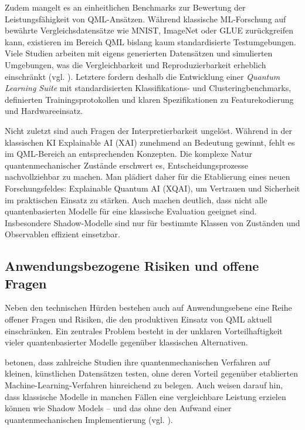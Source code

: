 Zudem mangelt es an einheitlichen Benchmarks zur Bewertung der Leistungsfähigkeit von QML-Ansätzen. Während klassische ML-Forschung auf bewährte Vergleichsdatensätze wie MNIST, ImageNet oder GLUE zurückgreifen kann, existieren im Bereich QML bislang kaum standardisierte Testumgebungen. Viele Studien arbeiten mit eigens generierten Datensätzen und simulierten Umgebungen, was die Vergleichbarkeit und Reproduzierbarkeit erheblich einschränkt (vgl. \cite{gujjuQuantumMachineLearning2024}).
Letztere fordern deshalb die Entwicklung einer \textit{Quantum Learning Suite} mit standardisierten Klassifikations- und Clusteringbenchmarks, definierten Trainingsprotokollen und klaren Spezifikationen zu Featurekodierung und Hardwareeinsatz.

Nicht zuletzt sind auch Fragen der Interpretierbarkeit ungelöst. Während in der klassischen KI Explainable AI (XAI) zunehmend an Bedeutung gewinnt, fehlt es im QML-Bereich an entsprechenden Konzepten. Die komplexe Natur quantenmechanischer Zustände erschwert es, Entscheidungsprozesse nachvollziehbar zu machen. Man plädiert daher für die Etablierung eines neuen Forschungsfeldes: Explainable Quantum AI (XQAI), um Vertrauen und Sicherheit im praktischen Einsatz zu stärken. Auch \cite{jerbiShadowsQuantumMachine2024} machen deutlich, dass nicht alle quantenbasierten Modelle für eine klassische Evaluation geeignet sind. Insbesondere Shadow-Modelle sind nur für bestimmte Klassen von Zuständen und Observablen effizient einsetzbar.

\subsection{Anwendungsbezogene Risiken und offene Fragen}
Neben den technischen Hürden bestehen auch auf Anwendungsebene eine Reihe offener Fragen und Risiken, die den produktiven Einsatz von QML aktuell einschränken. Ein zentrales Problem besteht in der unklaren Vorteilhaftigkeit vieler quantenbasierter Modelle gegenüber klassischen Alternativen. 

\cite{bowlesBetterClassicalSubtle2024} betonen, dass zahlreiche Studien ihre quantenmechanischen Verfahren auf kleinen, künstlichen Datensätzen testen, ohne deren Vorteil gegenüber etablierten Machine-Learning-Verfahren hinreichend zu belegen. Auch \cite{jerbiShadowsQuantumMachine2024} weisen darauf hin, dass klassische Modelle in manchen Fällen eine vergleichbare Leistung erzielen können wie Shadow Models – und das ohne den Aufwand einer quantenmechanischen Implementierung (vgl. \cite{jerbiShadowsQuantumMachine2024}).

